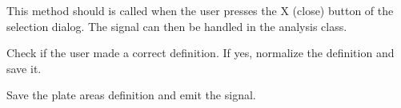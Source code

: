 \documentclass[letterpaper,10pt,english]{sphinxmanual}
\begin{document}
\begin{fulllineitems}
\begin{fulllineitems}
This method should is called when the user presses the X (close)
button of the selection dialog. The signal can then be handled
in the analysis class.

\end{fulllineitems}


\begin{fulllineitems}
\label{setlyze/gui:setlyze.gui.DefinePlateAreas.on_continue}
Check if the user made a correct definition. If yes, normalize
the definition and save it.

\end{fulllineitems}


\begin{fulllineitems}
\label{setlyze/gui:setlyze.gui.DefinePlateAreas.save}
Save the plate areas definition and emit the
 signal.

\end{fulllineitems}


\end{fulllineitems}

\end{document}
